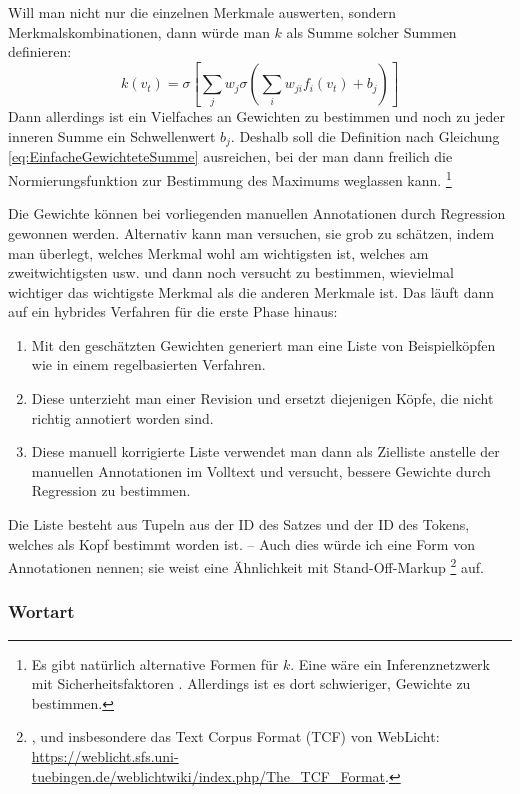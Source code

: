 \documentclass{article}
\renewcommand*{\see}{\autocap{v}gl\adddot}%
\begin{document}
Will man nicht nur die einzelnen Merkmale auswerten, sondern
Merkmalskombinationen, dann würde man $k$ als Summe solcher Summen
definieren:
\begin{equation}
  k(v_t) = \sigma\left[ \sum\limits_jw_j\sigma \left( \sum\limits_iw_{ji}f_i(v_t) +b_j\right)\right]
\end{equation}
Dann allerdings ist ein Vielfaches an Gewichten zu bestimmen und noch
zu jeder inneren Summe ein Schwellenwert $b_j$. Deshalb soll die
Definition nach Gleichung \ref{eq:EinfacheGewichteteSumme} ausreichen,
bei der man dann freilich die Normierungsfunktion zur Bestimmung des
Maximums weglassen kann.%
\footnote{Es gibt natürlich alternative Formen für $k$. Eine wäre ein
  Inferenznetzwerk mit
  Sicherheitsfaktoren \parencite[\see][90--96]{Beierle2014a}. Allerdings
  ist es dort schwieriger, Gewichte zu bestimmen.}

Die Gewichte können bei vorliegenden manuellen Annotationen durch
Regression gewonnen werden. Alternativ kann man versuchen, sie grob zu
schätzen, indem man überlegt, welches Merkmal wohl am wichtigsten ist,
welches am zweitwichtigsten usw. und dann noch versucht zu bestimmen,
wievielmal wichtiger das wichtigste Merkmal als die anderen Merkmale
ist. Das läuft dann auf ein hybrides Verfahren für die erste Phase
hinaus:
\begin{enumerate}%
\item Mit den geschätzten Gewichten generiert man eine Liste von
  Beispielköpfen wie in einem regelbasierten Verfahren.
\item Diese unterzieht man einer Revision
  und ersetzt diejenigen Köpfe, die nicht richtig annotiert worden
  sind.
\item Diese manuell korrigierte Liste verwendet man dann als Zielliste
  anstelle der manuellen Annotationen im Volltext und versucht,
  bessere Gewichte durch Regression zu bestimmen.
\end{enumerate}
Die Liste besteht aus Tupeln aus der ID des Satzes und der ID des
Tokens, welches als Kopf bestimmt worden ist. -- Auch dies würde ich
eine Form von Annotationen nennen; sie weist eine Ähnlichkeit mit
Stand-Off-Markup%
\footnote{\Cite[\see\ z.\,B.][575--579]{TEIP5}, und insbesondere das
  Text Corpus Format (TCF) von WebLicht:
  \url{https://weblicht.sfs.uni-tuebingen.de/weblichtwiki/index.php/The_TCF_Format}.} %
auf.


\subsubsection{Wortart}
\end{document}
